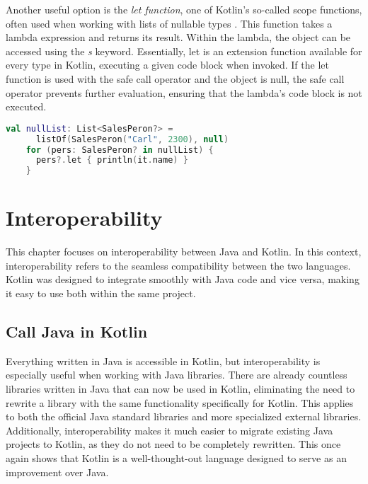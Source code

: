 \documentclass[a4paper, 11pt]{article}
\begin{document}
  Another useful option is the \textit{let function}, one of Kotlin's so-called scope functions, often used when working with lists of nullable types \cite{nullsafety-letfunc}. This function takes a lambda expression and returns its result. Within the lambda, the object can be accessed using the \textit{s} keyword. Essentially, let is an extension function available for every type in Kotlin, executing a given code block when invoked. If the let function is used with the safe call operator and the object is null, the safe call operator prevents further evaluation, ensuring that the lambda's code block is not executed.
  \begin{lstlisting}[language=Kotlin]
    val nullList: List<SalesPeron?> =
      listOf(SalesPeron("Carl", 2300), null)
    for (pers: SalesPeron? in nullList) {
      pers?.let { println(it.name) }
    }
  \end{lstlisting}


\section{Interoperability}
  This chapter focuses on interoperability between Java and Kotlin. In this context, interoperability refers to the seamless compatibility between the two languages. Kotlin was designed to integrate smoothly with Java code and vice versa, making it easy to use both within the same project.

\subsection{Call Java in Kotlin}
  Everything written in Java is accessible in Kotlin, but interoperability is especially useful when working with Java libraries. There are already countless libraries written in Java that can now be used in Kotlin, eliminating the need to rewrite a library with the same functionality specifically for Kotlin. This applies to both the official Java standard libraries and more specialized external libraries. Additionally, interoperability makes it much easier to migrate existing Java projects to Kotlin, as they do not need to be completely rewritten. This once again shows that Kotlin is a well-thought-out language designed to serve as an improvement over Java.
\end{document}
